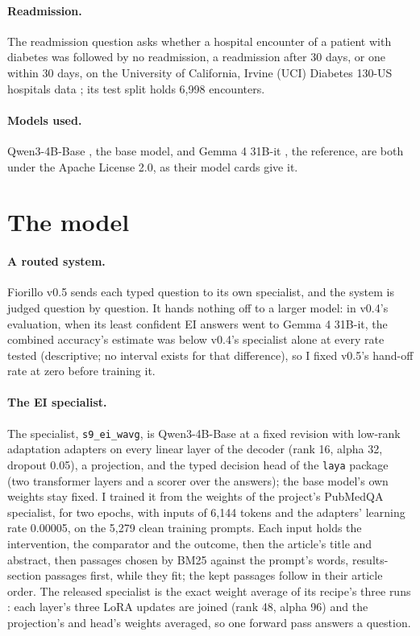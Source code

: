 \documentclass[11pt,letterpaper]{article}
\newcommand{\sysname}[1]{\texttt{#1}}
\begin{document}
\paragraph{Readmission.} The readmission question asks whether a hospital encounter of a patient with diabetes was followed by no readmission, a readmission after 30 days, or one within 30 days, on the University of California, Irvine (UCI) Diabetes 130-US hospitals data \citep[CC BY 4.0;][]{strack2014}; its test split holds 6,998 encounters.

\paragraph{Models used.} Qwen3-4B-Base \citep{qwen3}, the base model, and Gemma 4 31B-it \citep{gemma4}, the reference, are both under the Apache License 2.0, as their model cards give it.

\section{The model}
\label{sec:model}

\paragraph{A routed system.} Fiorillo v0.5 sends each typed question to its own specialist, and the system is judged question by question. It hands nothing off to a larger model: in v0.4's evaluation, when its least confident EI answers went to Gemma 4 31B-it, the combined accuracy's estimate was below v0.4's specialist alone at every rate tested (descriptive; no interval exists for that difference), so I fixed v0.5's hand-off rate at zero before training it.

\paragraph{The EI specialist.} The specialist, \sysname{s9\_ei\_wavg}, is Qwen3-4B-Base at a fixed revision with low-rank adaptation \citep[LoRA;][]{hu2022} adapters on every linear layer of the decoder (rank 16, alpha 32, dropout 0.05), a projection, and the typed decision head of the \texttt{laya} package (two transformer layers and a scorer over the answers); the base model's own weights stay fixed. I trained it from the weights of the project's PubMedQA specialist, for two epochs, with inputs of 6,144 tokens and the adapters' learning rate 0.00005, on the 5,279 clean training prompts. Each input holds the intervention, the comparator and the outcome, then the article's title and abstract, then passages chosen by BM25 against the prompt's words, results-section passages first, while they fit; the kept passages follow in their article order. The released specialist is the exact weight average of its recipe's three runs \citep[as in model soups;][]{wortsman2022}: each layer's three LoRA updates are joined (rank 48, alpha 96) and the projection's and head's weights averaged, so one forward pass answers a question.
\end{document}
